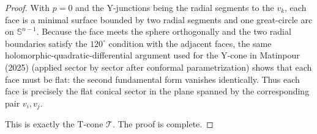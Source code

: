 \documentclass[10pt,a4paper]{amsart}
\begin{document}
\begin{proof}
With \(p = 0\) and the Y-junctions being the radial segments to the \(v_k\), each face is a minimal surface bounded by two radial segments and one great-circle arc on \(\mathbb{S}^{n-1}\). Because the face meets the sphere orthogonally and the two radial boundaries satisfy the \(120^\circ\) condition with the adjacent faces, the same holomorphic-quadratic-differential argument used for the Y-cone in Matinpour (2025) (applied sector by sector after conformal parametrization) shows that each face must be flat: the second fundamental form vanishes identically. Thus each face is precisely the flat conical sector in the plane spanned by the corresponding pair \(v_i,v_j\).

This is exactly the T-cone \(\mathcal{T}\). The proof is complete.
\end{proof}
\end{document}
